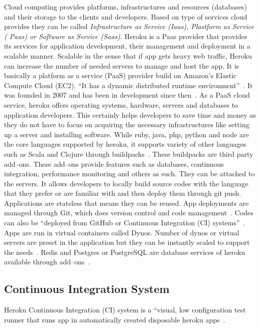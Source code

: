  Cloud computing provides platforms, infrastructures and resources (databases)
 and their storage to the clients and developers. Based on type of services
 cloud provides they can be called \textit{Infrastructure as Service (Iaas),
 Plastform as Service ( Paas) or Software as Service (Saas)}. Heroku is a Paas
 provider that provides its services for application development, their management and
 deployment in a scalable manner. Scalable in the sense that if app gets 
 heavy web traffic, Heroku can increase the number of needed servers to manage
 and host the app. It is basically a platform as a service (PaaS) provider
 build on Amazon's Elastic Compute Cloud (EC2). ``It has a dynamic distributed
 runtime environment''~\cite{hid-sp18-415-www-devcenter-heroku}. It was founded
 in  2007 and has been
 in development since then~\cite{hid-sp18-415-www-wikipedia-org}.
 As a PaaS cloud service, heroku
 offers operating systems, hardware, servers and databases to application 
 developers. This certainly helps developers to save time and money as they do
 not have to focus on acquiring the necessary infrastructures like setting up 
 a server and installing software. While ruby, java, php, python and node are 
 the core languages supported by heroku, it supports variety 
 of other languages such as Scala and Clojure through 
 buildpacks~\cite{hid-sp18-415-www-wikipedia-org}.
 These buildpacks are third party add--ons. These add--ons provide features such as
 databases, continuous integration, performance monitoring and others as such. 
 They can be attached to the servers. It allows developers to locally build 
 source codes with the language that they prefer or are familiar with and then
 deploy them through git push. Applications are stateless that means they can 
 be reused. App deployments are managed through Git, which does version control
 and code management~\cite{hid-sp18-415-www-how-heroku-works}. Codes can also
 be ``deployed from GitHub or Continuous Integration (CI) 
 systems''~\cite{hid-sp18-415-www-heroku-com}.   
 Apps are run in virtual containers called Dynos. Number of dynos or virtual 
 servers are preset in the application but they can be instantly scaled to 
 support the needs~\cite{hid-sp18-415-www-how-heroku-works}. Redis and Postgres
 or PostgreSQL are database services of heroku available through 
 add--ons~\cite{hid-sp18-415-www-heroku-com}.

\subsection{Continuous Integration System}
 Heroku Continuous Integration (CI) system is a ``visual, low configuration
 test runner that runs app in automatically created disposable 
 heroku apps~\cite{hid-sp18-415-www-heroku-ci}.


